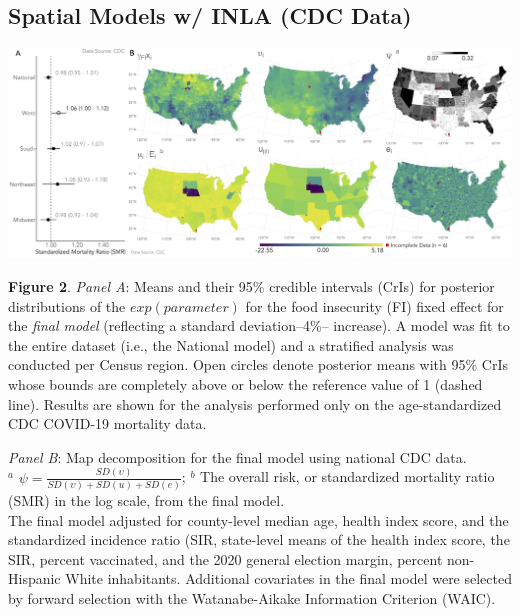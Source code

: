 \documentclass[aspectratio=169]{beamer}
\begin{document}
\subsection{Spatial Models w/ INLA (CDC Data)}
\begin{frame}
	
	
	
	\vspace*{-0.02 cm}
	\hspace*{-0.45 cm}
	\centering
	\includegraphics[scale=0.122]{images-logos/combo-forest-map-decomp-cdc.png}
	
	\raggedright
	\tiny{\textbf{Figure 2}. \textit{Panel A}: Means and their 95\% credible intervals (CrIs) for posterior distributions of the $exp(parameter)$ for the food insecurity (FI) fixed effect for the \textit{final model} (reflecting a standard deviation--4\%-- increase). A model was fit to the entire dataset (i.e., the National model) and a stratified analysis was conducted per Census region. Open circles denote posterior means with 95\% CrIs whose bounds are completely above or below the reference value of 1 (dashed line). Results are shown for the analysis performed only on the age-standardized CDC COVID-19 mortality data. 
		
		\vspace{0.25cm}
		
		\textit{Panel B}: Map decomposition for the final model using national CDC data.\\
		$^a$ $\psi=\frac{SD(\upsilon)}{SD(\upsilon)+SD(u)+SD(e)}$;
		$^b$ The overall risk, or standardized mortality ratio (SMR) in the log scale, from the final model.\\
		The final model adjusted for county-level median age, health index score, and the standardized incidence ratio (SIR, state-level means of the health index score, the SIR, percent vaccinated, and the 2020 general election margin, percent non-Hispanic White inhabitants. Additional covariates in the final model were selected by forward selection with the Watanabe-Aikake Information Criterion (WAIC).}
	
	
\end{frame}
\end{document}
